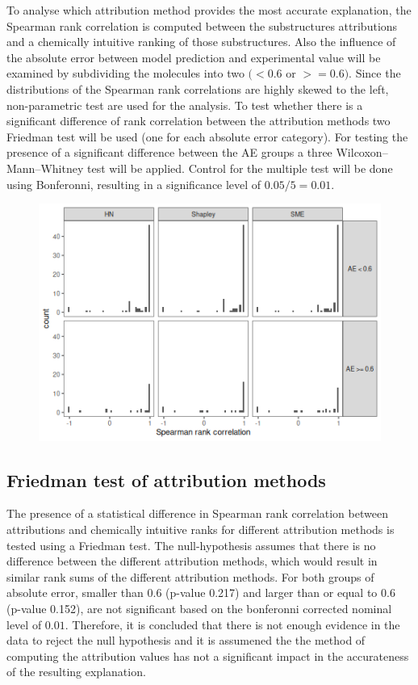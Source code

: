 To analyse which attribution method provides the most accurate
explanation, the Spearman rank correlation is computed between the
substructures attributions and a chemically intuitive ranking of those
substructures. Also the influence of the absolute error between model
prediction and experimental value will be examined by subdividing the
molecules into two \((<0.6\) or \(>=0.6)\). Since the distributions of
the Spearman rank correlations are highly skewed to the left,
non-parametric test are used for the analysis. To test whether there is
a significant difference of rank correlation between the attribution
methods two Friedman test will be used (one for each absolute error
category). For testing the presence of a significant difference between
the AE groups a three Wilcoxon--Mann--Whitney test will be applied.
Control for the multiple test will be done using Bonferonni, resulting
in a significance level of \(0.05/5 = 0.01\).


\begin{figure}[H]
    \includegraphics[scale=0.5]{./distributions-1.png}
\end{figure}


\subsection{Friedman test of attribution methods}
\label{friedman-test-of-attribution-methods}


The presence of a statistical difference in Spearman rank correlation
between attributions and chemically intuitive ranks for different
attribution methods is tested using a Friedman test. The null-hypothesis
assumes that there is no difference between the different attribution
methods, which would result in similar rank sums of the different
attribution methods. For both groups of absolute error, smaller than
\(0.6\) (p-value 0.217) and larger than or equal to \(0.6\) (p-value
0.152), are not significant based on the bonferonni corrected nominal
level of \(0.01\). Therefore, it is concluded that there is not enough
evidence in the data to reject the null hypothesis and it is assumened
the the method of computing the attribution values has not a significant
impact in the accurateness of the resulting explanation.


